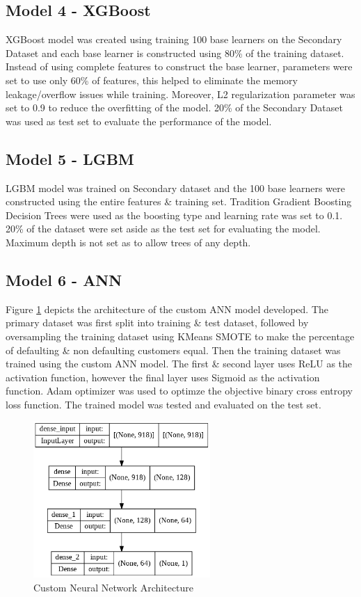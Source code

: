 \documentclass[twoside,11pt,a4paper]{article}
\begin{document}
\subsection{Model 4 - \acf{XGBoost}}
\acs{XGBoost} model was created using training 100 base learners on the Secondary Dataset and each base learner is constructed using 80\% of the training dataset. Instead of using complete features to construct the base learner, parameters were set to use only 60\% of features, this helped to eliminate the memory leakage/overflow issues while training. Moreover, L2 regularization parameter was set to 0.9 to reduce the overfitting of the model. 20\% of the Secondary Dataset was used as test set to evaluate the performance of the model.

\subsection{Model 5 - \acf{LGBM}}
\acs{LGBM} model was trained on Secondary dataset and the 100 base learners were constructed using the entire features \& training set. Tradition Gradient Boosting Decision Trees were used as the boosting type and learning rate was set to 0.1. 20\% of the dataset were set aside as the test set for evaluating the model. Maximum depth is not set as to allow trees of any depth. 

\subsection{Model 6 - \acf{ANN}}
Figure \ref{fig:nn_arch} depicts the architecture of the custom \acs{ANN} model developed.  The primary dataset was first split into training \& test dataset, followed by oversampling the training dataset using KMeans \acs{SMOTE} to make the percentage of defaulting \& non defaulting customers equal. Then the training dataset was trained using the custom \acs{ANN} model. The first \& second layer uses \acf{ReLU} as the activation function, however the final layer uses Sigmoid as the activation function. Adam optimizer was used to optimze the objective binary cross entropy loss function. The trained model was tested and evaluated on the test set.\\
\begin{figure}[ht]
	\centering
	\includegraphics[width=0.6\textwidth, height=0.3\textheight]{nn_arch}
	\caption[Custom Neural Network Architecture]{Custom Neural Network Architecture}
	\label{fig:nn_arch}
\end{figure}
\end{document}
